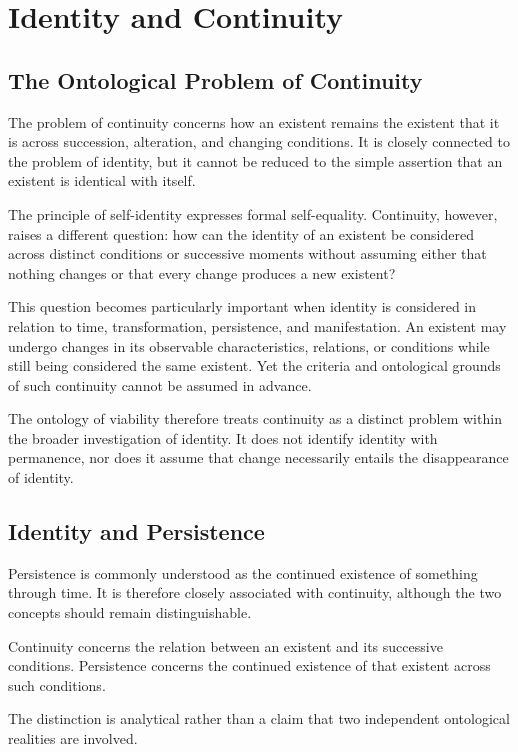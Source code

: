 
\section{Identity and Continuity}
\label{sec:identity-and-continuity}

\subsection{The Ontological Problem of Continuity}

The problem of continuity concerns how an existent remains the existent that it is across succession, alteration, and changing conditions. It is closely connected to the problem of identity, but it cannot be reduced to the simple assertion that an existent is identical with itself.

The principle of self-identity expresses formal self-equality. Continuity, however, raises a different question: how can the identity of an existent be considered across distinct conditions or successive moments without assuming either that nothing changes or that every change produces a new existent?

This question becomes particularly important when identity is considered in relation to time, transformation, persistence, and manifestation. An existent may undergo changes in its observable characteristics, relations, or conditions while still being considered the same existent. Yet the criteria and ontological grounds of such continuity cannot be assumed in advance.

The ontology of viability therefore treats continuity as a distinct problem within the broader investigation of identity. It does not identify identity with permanence, nor does it assume that change necessarily entails the disappearance of identity.

\subsection{Identity and Persistence}

Persistence is commonly understood as the continued existence of something through time. It is therefore closely associated with continuity, although the two concepts should remain distinguishable.

Continuity concerns the relation between an existent and its successive conditions. Persistence concerns the continued existence of that existent across such conditions.

The distinction is analytical rather than a claim that two independent ontological realities are involved.

